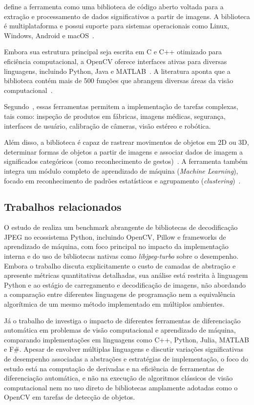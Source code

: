 \cite{bradski2000opencv} define a ferramenta como uma biblioteca de código aberto voltada para a extração e processamento de dados significativos a partir de imagens. A biblioteca é multiplataforma e possui suporte para sistemas operacionais como Linux, Windows, Android e macOS~\citep{kaehler2017learning}. 

Embora sua estrutura principal seja escrita em C e C++ otimizado para eficiência computacional, a OpenCV oferece interfaces ativas para diversas linguagens, incluindo Python, Java e MATLAB~\citep{kaehler2017learning}. A literatura aponta que a biblioteca contém mais de 500 funções que abrangem diversas áreas da visão computacional~\citep{kaehler2017learning, bradski2000opencv}. 

Segundo~\cite{kaehler2017learning}, essas ferramentas permitem a implementação de tarefas complexas, tais como: inspeção de produtos em fábricas, imagens médicas, segurança, interfaces de usuário, calibração de câmeras, visão estéreo e robótica.

Além disso, a biblioteca é capaz de rastrear movimentos de objetos em 2D ou 3D, determinar formas de objetos a partir de imagens e associar dados de imagem a significados categóricos (como reconhecimento de gestos)~\citep{bradski2000opencv}. A ferramenta também integra um módulo completo de aprendizado de máquina (\textit{Machine Learning}), focado em reconhecimento de padrões estatísticos e agrupamento (\textit{clustering})~\citep{kaehler2017learning}.

\subsection{Trabalhos relacionados}
O estudo de \cite{iglovikov2025needspeedcomprehensivebenchmark} realiza um benchmark abrangente de bibliotecas de decodificação JPEG no ecossistema Python, incluindo OpenCV, Pillow e frameworks de aprendizado de máquina, com foco principal no impacto da implementação interna e do uso de bibliotecas nativas como \textit{libjpeg-turbo} sobre o desempenho. Embora o trabalho discuta explicitamente o custo de camadas de abstração e apresente métricas quantitativas detalhadas, sua análise está restrita à linguagem Python e ao estágio de carregamento e decodificação de imagens, não abordando a comparação entre diferentes linguagens de programação nem a equivalência algorítmica de um mesmo método implementado em múltiplos ambientes.

Já o trabalho de \cite{srajer2018benchmarkselectedalgorithmicdifferentiation} investiga o impacto de diferentes ferramentas de diferenciação automática em problemas de visão computacional e aprendizado de máquina, comparando implementações em linguagens como C++, Python, Julia, MATLAB e F\#. Apesar de envolver múltiplas linguagens e discutir variações significativas de desempenho associadas a abstrações e estratégias de implementação, o foco do estudo está na computação de derivadas e na eficiência de ferramentas de diferenciação automática, e não na execução de algoritmos clássicos de visão computacional nem no uso direto de bibliotecas amplamente adotadas como o OpenCV em tarefas de detecção de objetos.

